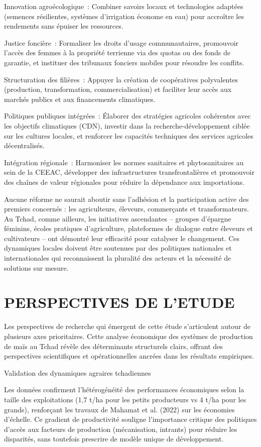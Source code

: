 \documentclass[12pt,oneside]{report}
\begin{document}
Innovation agroécologique : Combiner savoirs locaux et technologies adaptées (semences résilientes, systèmes d’irrigation économe en eau) pour accroître les rendements sans épuiser les ressources.

Justice foncière : Formaliser les droits d’usage communautaires, promouvoir l’accès des femmes à la propriété terrienne via des quotas ou des fonds de garantie, et instituer des tribunaux fonciers mobiles pour résoudre les conflits.

Structuration des filières : Appuyer la création de coopératives polyvalentes (production, transformation, commercialisation) et faciliter leur accès aux marchés publics et aux financements climatiques.

Politiques publiques intégrées : Élaborer des stratégies agricoles cohérentes avec les objectifs climatiques (CDN), investir dans la recherche-développement ciblée sur les cultures locales, et renforcer les capacités techniques des services agricoles décentralisés.

Intégration régionale : Harmoniser les normes sanitaires et phytosanitaires au sein de la CEEAC, développer des infrastructures transfrontalières et promouvoir des chaînes de valeur régionales pour réduire la dépendance aux importations.

Aucune réforme ne saurait aboutir sans l’adhésion et la participation active des premiers concernés : les agriculteurs, éleveurs, commerçants et transformateurs. Au Tchad, comme ailleurs, les initiatives ascendantes – groupes d’épargne féminins, écoles pratiques d’agriculture, plateformes de dialogue entre éleveurs et cultivateurs – ont démontré leur efficacité pour catalyser le changement. Ces dynamiques locales doivent être soutenues par des politiques nationales et internationales qui reconnaissent la pluralité des acteurs et la nécessité de solutions sur mesure.

\chapter{PERSPECTIVES DE L’ETUDE}
Les perspectives de recherche qui émergent de cette étude s'articulent autour de plusieurs axes prioritaires. Cette analyse économique des systèmes de production de maïs au Tchad révèle des déterminants structurels clairs, offrant des perspectives scientifiques et opérationnelles ancrées dans les résultats empiriques.

Validation des dynamiques agraires tchadiennes

Les données confirment l’hétérogénéité des performances économiques selon la taille des exploitations (1,7 t/ha pour les petits producteurs vs 4 t/ha pour les grands), renforçant les travaux de Mahamat et al. (2022) sur les économies d’échelle. Ce gradient de productivité souligne l’importance critique des politiques d’accès aux facteurs de production (mécanisation, intrants) pour réduire les disparités, sans toutefois prescrire de modèle unique de développement.
\end{document}
